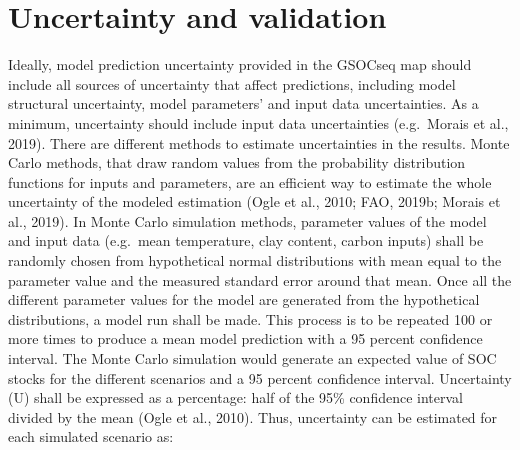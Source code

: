 \documentclass[
  10pt,
  b5paper,
]{book}
\newenvironment{Shaded}{\begin{snugshade}}{\end{snugshade}}
\newcommand{\AttributeTok}[1]{\textcolor[rgb]{0.77,0.63,0.00}{#1}}
\newcommand{\DecValTok}[1]{\textcolor[rgb]{0.00,0.00,0.81}{#1}}
\newcommand{\FunctionTok}[1]{\textcolor[rgb]{0.00,0.00,0.00}{#1}}
\newcommand{\NormalTok}[1]{#1}
\newcommand{\OtherTok}[1]{\textcolor[rgb]{0.56,0.35,0.01}{#1}}
\newcommand{\SpecialCharTok}[1]{\textcolor[rgb]{0.00,0.00,0.00}{#1}}
\newcommand{\StringTok}[1]{\textcolor[rgb]{0.31,0.60,0.02}{#1}}
\begin{document}
\begin{Shaded}
\end{Shaded}

\hypertarget{uncertainty-and-validation}{%
\chapter{\textbar{} Uncertainty and validation}\label{uncertainty-and-validation}}

Ideally, model prediction uncertainty provided in the GSOCseq map should include all sources of uncertainty that affect predictions, including model structural uncertainty, model parameters' and input data uncertainties. As a minimum, uncertainty should include input data uncertainties (e.g.~Morais et al., 2019).
There are different methods to estimate uncertainties in the results. Monte Carlo methods, that draw random values from the probability distribution functions for inputs and parameters, are an efficient way to estimate the whole uncertainty of the modeled estimation (Ogle et al., 2010; FAO, 2019b; Morais et al., 2019). In Monte Carlo simulation methods, parameter values of the model and input data (e.g.~mean temperature, clay content, carbon inputs) shall be randomly chosen from hypothetical normal distributions with mean equal to the parameter value and the measured standard error around that mean. Once all the different parameter values for the model are generated from the hypothetical distributions, a model run shall be made. This process is to be repeated 100 or more times to produce a mean model prediction with a 95 percent confidence interval. The Monte Carlo simulation would generate an expected value of SOC stocks for the different scenarios and a 95 percent confidence interval.
Uncertainty (U) shall be expressed as a percentage: half of the 95\% confidence interval divided by the mean (Ogle et al., 2010). Thus, uncertainty can be estimated for each simulated scenario as:
\end{document}
